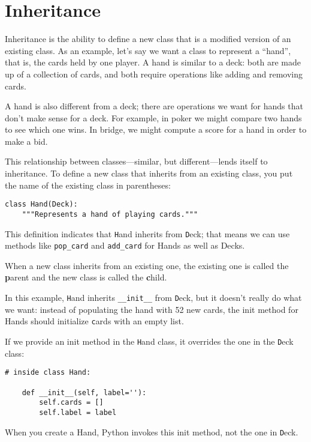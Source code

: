 \documentclass[
DIV=11,
fontsize=12,
twoside,
headinclude=false,
titlepage=firstiscover,
abstract=true,
headsepline=true,
footsepline=true,
chapterprefix=true, %
headings=big,
bibliography=totoc,%
captions=tableheading
]{scrbook}
\theoremstyle{definition}
\begin{document}
\section{Inheritance}

Inheritance is the ability to define a new class that is a modified
version of an existing class.  As an example, let's say we want a
class to represent a ``hand'', that is, the cards held by one player.
A hand is similar to a deck: both are made up of a collection of
cards, and both require operations like adding and removing cards.

A hand is also different from a deck; there are operations we want for
hands that don't make sense for a deck.  For example, in poker we
might compare two hands to see which one wins.  In bridge, we might
compute a score for a hand in order to make a bid.

This relationship between classes---similar, but different---lends
itself to inheritance.
To define a new class that inherits from an existing class,
you put the name of the existing class in parentheses:

\begin{lstlisting}
class Hand(Deck):
    """Represents a hand of playing cards."""
\end{lstlisting}
%
This definition indicates that {\texttt Hand} inherits from {\texttt Deck};
that means we can use methods like \verb"pop_card" and \verb"add_card"
for Hands as well as Decks.

When a new class inherits from an existing one, the existing
one is called the {\textbf parent} and the new class is
called the {\textbf child}.

In this example, {\texttt Hand} inherits \verb"__init__" from {\texttt Deck},
but it doesn't really do what we want: instead of populating the hand
with 52 new cards, the init method for Hands should initialize {\texttt
  cards} with an empty list.   

If we provide an init method in the {\texttt Hand} class, it overrides the
one in the {\texttt Deck} class:

\begin{lstlisting}
# inside class Hand:

    def __init__(self, label=''):
        self.cards = []
        self.label = label
\end{lstlisting}
%
When you create a Hand, Python invokes this init method, not the
one in {\texttt Deck}.
\end{document}
